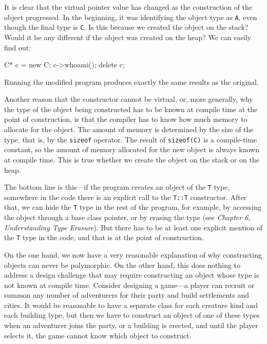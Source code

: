 It is clear that the virtual pointer value has changed as the construction of the object progressed. In the beginning, it was identifying the object type as \texttt{A}, even though the final type is \texttt{C}. Is this because we created the object on the stack? Would it be any different if the object was created on the heap? We can easily find out:

\begin{code}
C* c = new C;
c->whoami();
delete c;
\end{code}

Running the modified program produces exactly the same results as the original.

Another reason that the constructor cannot be virtual, or, more generally, why the type of the object being constructed has to be known at compile time at the point of construction, is that the compiler has to know how much memory to allocate for the object. The amount of memory is determined by the size of the type, that is, by the \texttt{sizeof} operator. The result of \texttt{sizeof(C)} is a compile-time constant, so the amount of memory allocated for the new object is always known at compile time. This is true whether we create the object on the stack or on the heap.

The bottom line is this---if the program creates an object of the \texttt{T} type, somewhere in the code there is an explicit call to the \texttt{T::T} constructor. After that, we can hide the \texttt{T} type in the rest of the program, for example, by accessing the object through a base class pointer, or by erasing the type (see \emph{Chapter 6, Understanding Type Erasure}). But there has to be at least one explicit mention of the \texttt{T} type in the code, and that is at the point of construction.

On the one hand, we now have a very reasonable explanation of why constructing objects can never be polymorphic. On the other hand, this does nothing to address a design challenge that may require constructing an object whose type is not known at compile time. Consider designing a game---a player can recruit or summon any number of adventurers for their party and build settlements and cities. It would be reasonable to have a separate class for each creature kind and each building type, but then we have to construct an object of one of these types when an adventurer joins the party, or a building is erected, and until the player selects it, the game cannot know which object to construct.

